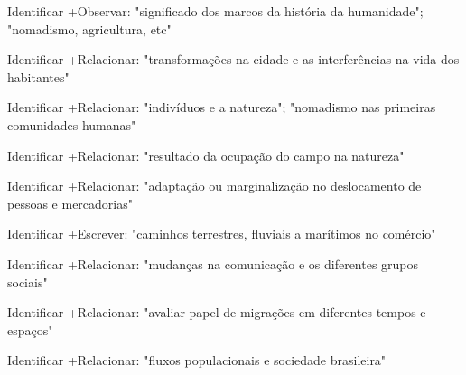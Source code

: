  Identificar +Observar: "significado dos marcos da história da humanidade"; "nomadismo, agricultura, etc"

 Identificar +Relacionar: "transformações na cidade e as interferências na vida dos habitantes"

 Identificar +Relacionar: "indivíduos e a natureza"; "nomadismo nas primeiras comunidades humanas"

 Identificar +Relacionar: "resultado da ocupação do campo na natureza"

 Identificar +Relacionar: "adaptação ou marginalização no deslocamento de pessoas e mercadorias"

 Identificar +Escrever: "caminhos terrestres, fluviais a marítimos no comércio"

 Identificar +Relacionar: "mudanças na comunicação e os diferentes grupos sociais"

 Identificar +Relacionar: "avaliar papel de migrações em diferentes tempos e espaços"

 Identificar +Relacionar: "fluxos populacionais e sociedade brasileira"

